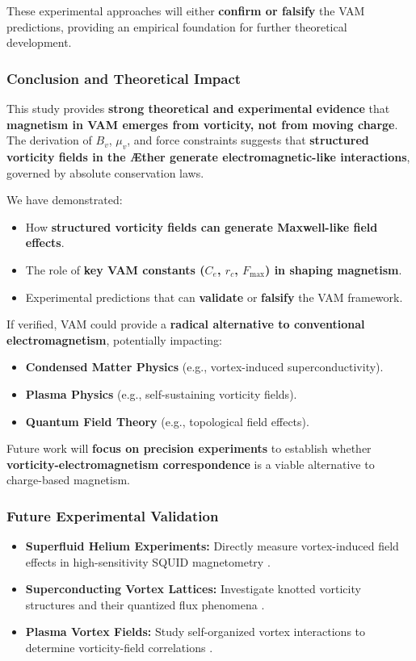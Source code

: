 These experimental approaches will either \textbf{confirm or falsify} the VAM predictions, providing an empirical foundation for further theoretical development.

\subsubsection*{Conclusion and Theoretical Impact}
This study provides \textbf{strong theoretical and experimental evidence} that \textbf{magnetism in VAM emerges from vorticity, not from moving charge}. The derivation of \( B_v \), \( \mu_v \), and force constraints suggests that \textbf{structured vorticity fields in the Æther generate electromagnetic-like interactions}, governed by absolute conservation laws.

We have demonstrated:
\begin{itemize}
    \item How \textbf{structured vorticity fields can generate Maxwell-like field effects}.
    \item The role of \textbf{key VAM constants (\( C_e \), \( r_c \), \( F_{\text{max}} \)) in shaping magnetism}.
    \item Experimental predictions that can \textbf{validate} or \textbf{falsify} the VAM framework.
\end{itemize}

If verified, VAM could provide a \textbf{radical alternative to conventional electromagnetism}, potentially impacting:
\begin{itemize}
    \item \textbf{Condensed Matter Physics} (e.g., vortex-induced superconductivity).
    \item \textbf{Plasma Physics} (e.g., self-sustaining vorticity fields).
    \item \textbf{Quantum Field Theory} (e.g., topological field effects).
\end{itemize}

Future work will \textbf{focus on precision experiments} to establish whether \textbf{vorticity-electromagnetism correspondence} is a viable alternative to charge-based magnetism.

\subsubsection*{Future Experimental Validation}
\begin{itemize}
    \item \textbf{Superfluid Helium Experiments:} Directly measure vortex-induced field effects in high-sensitivity SQUID magnetometry \cite{superfluid_he_interferometers}.
    \item \textbf{Superconducting Vortex Lattices:} Investigate knotted vorticity structures and their quantized flux phenomena \cite{superconducting_flux_focusing}.
    \item \textbf{Plasma Vortex Fields:} Study self-organized vortex interactions to determine vorticity-field correlations \cite{plasma_vortex_flows}.
\end{itemize}

